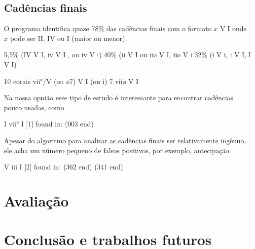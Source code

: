 \documentclass{article}
\begin{document}
\subsection{Cadências finais}
\label{sec:cadencias}

O programa identifica quase 78\% das cadências finais com o formato
$x$ V I onde $x$ pode ser II, IV ou I (maior ou menor).

5,5\% (IV V I,  iv   V    I , ou iv   V    i)
40\% (ii   V    I ou iiø  V    I, iiø  V    i
32\% (i V i, i V I, I V I)

10 corais  vii°/V (ou ø7) V    I (ou i)
7 viiø V    I

Na nossa opnião esse tipo de estudo é interessante para encontrar
cadências pouco usadas, como

 I    vii° I    [1] found in: (003 end) 

Apesar do algoritmo para analisar as cadências finais ser
relativamente ingênuo, ele acha um número pequeno de falsos positivos,
por exemplo, antecipação:

 V    iii  I    [2] found in: (362 end) (341 end) 

\section{Avaliação}
\label{sec:avaliacao}

\section{Conclusão e trabalhos futuros}
\label{sec:concl-e-trab}

\renewcommand{\refname}{Referências Bibliográficas}


\end{document}
